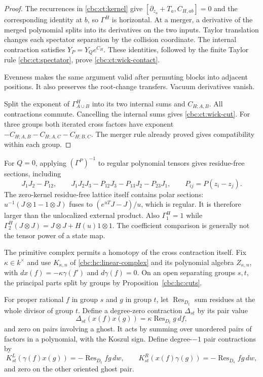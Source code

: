 \begin{proof}
The recurrences in \eqref{cbc:ct:kernel} give
$[\partial_{z_a}+T_a,C_{H,ab}]=0$ and the corresponding
identity at $b$, so $\Gamma^H$ is horizontal. At a merger,
a derivative of the merged polynomial splits into its derivatives
on the two inputs. Taylor translation changes each spectator
separation by the collision coordinate. The internal contraction
satisfies $Y_P=Y_Qe^{C_H}$. These identities, followed by the
finite Taylor rule \eqref{cbc:ct:spectator}, prove
\eqref{cbc:ct:wick-contact}.

Evenness makes the same argument
valid after permuting blocks into adjacent positions. It also
preserves the root-change transfers. Vacuum derivatives vanish.

Split the exponent of $\Gamma^H_{A\cup B}$ into its two
internal sums and $C_{H;A,B}$. All contractions commute.
Cancelling the internal sums gives \eqref{cbc:ct:wick-cut}.
For three groups both iterated cross factors have exponent
$-C_{H;A,B}-C_{H;A,C}-C_{H;B,C}$. The merger rule already
proved gives compatibility within each group.
\end{proof}

For $Q=0$, applying $(\Gamma^P)^{-1}$ to regular polynomial
tensors gives residue-free sections, including
\[
 J_1J_2-P_{12},\qquad
 J_1J_2J_3-P_{12}J_3-P_{13}J_2-P_{23}J_1,
 \qquad P_{ij}=P(z_i-z_j).
\]
The zero-kernel residue-free lattice itself contains polar
sections: $u^{-1}(J\otimes1-1\otimes J)$ fuses to
$(e^{uT}J-J)/u$, which is regular. It is therefore larger than
the unlocalized external product. Also $\Gamma_1^H=1$
while $\Gamma_2^H(J\otimes J)=J\otimes J+H(u)1\otimes1$.
The coefficient comparison is generally not the tensor power
of a state map.

The primitive complex permits a homotopy of the cross
contraction itself. Fix $\kappa\in k^\times$ and use
$K_{\kappa,n}$ of \eqref{cbc:hc:linear-complex} and its
polynomial algebra $Z_{\kappa,n}$, with
$dx(f)=-\kappa\gamma(f')$ and $d\gamma(f)=0$.
On an open separating groups $s,t$, the principal parts split
by groups by Proposition~\ref{cbc:hc:cuts}.

For proper rational
$f$ in group $s$ and $g$ in group $t$, let
$\operatorname{Res}_{D_t}$ sum residues at the whole divisor
of group $t$. Define a degree-zero contraction $\Delta_{st}$
by its pair value
\begin{equation}\label{cbc:ct:wick-pair}
 \Delta_{st}(x(f)x(g))
       =\kappa\operatorname{Res}_{D_t}g\,df,
\end{equation}
and zero on pairs involving a ghost. It acts by summing over
unordered pairs of factors in a polynomial, with the Koszul
sign. Define degree-$-1$ pair contractions by
\begin{equation}\label{cbc:ct:wick-primitives}
 K^L_{st}(\gamma(f)x(g))=-\operatorname{Res}_{D_t}fg\,dw,
 \qquad
 K^R_{st}(x(f)\gamma(g))=-\operatorname{Res}_{D_s}fg\,dw,
\end{equation}
and zero on the other oriented ghost pair.

